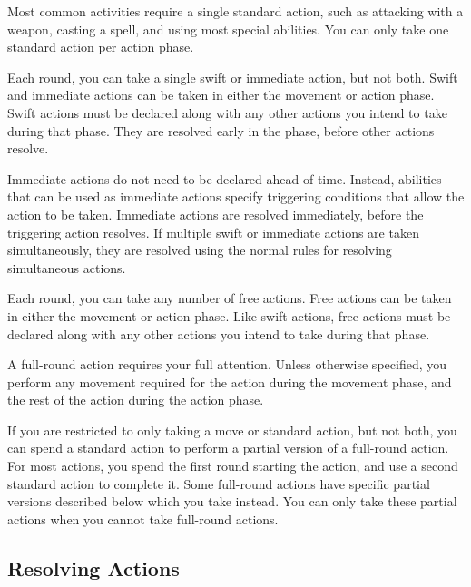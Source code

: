          Most common activities require a single standard action, such as attacking with a weapon, casting a spell, and using most special abilities.
        You can only take one standard action per action phase.

        \label{Swift and Immediate Actions} Each round, you can take a single swift or immediate action, but not both.
        Swift and immediate actions can be taken in either the movement or action phase.
        Swift actions must be declared along with any other actions you intend to take during that phase.
        They are resolved early in the phase, before other actions resolve.

        Immediate actions do not need to be declared ahead of time.
        Instead, abilities that can be used as immediate actions specify triggering conditions that allow the action to be taken.
        Immediate actions are resolved immediately, before the triggering action resolves.
        If multiple swift or immediate actions are taken simultaneously, they are resolved using the normal rules for resolving simultaneous actions.

        \label{Free Actions} Each round, you can take any number of free actions.
        Free actions can be taken in either the movement or action phase.
        Like swift actions, free actions must be declared along with any other actions you intend to take during that phase.

         A full-round action requires your full attention.
        Unless otherwise specified, you perform any movement required for the action during the movement phase, and the rest of the action during the action phase.

         If you are restricted to only taking a move or standard action, but not both, you can spend a standard action to perform a partial version of a full-round action. For most actions, you spend the first round starting the action, and use a second standard action to complete it. Some full-round actions have specific partial versions described below which you take instead. You can only take these partial actions when you cannot take full-round actions.

    \subsection{Resolving Actions}\label{Resolving Actions}

